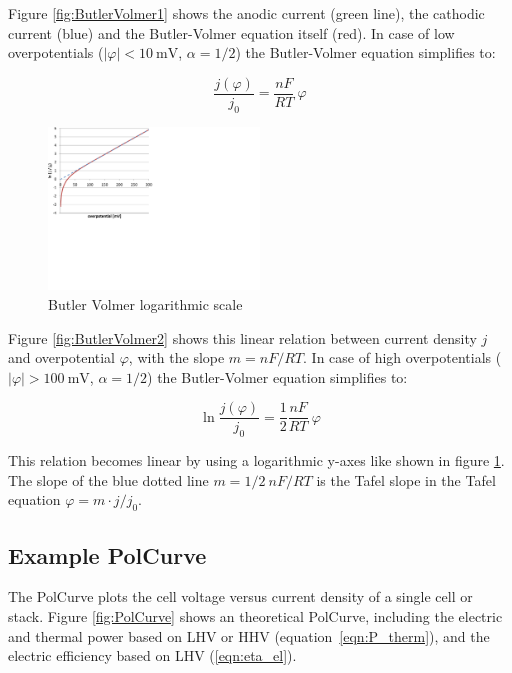 \documentclass[11pt,a4paper,english,twoside]{scrreprt}
\begin{document}
Figure \ref{fig:ButlerVolmer1} shows the anodic current (green line), the cathodic current (blue) and the Butler-Volmer equation itself (red). In case of low overpotentials ($\left|\varphi\right| < \SI{10}{\milli\volt}$, $\alpha = 1/2$) the Butler-Volmer equation simplifies to:

\[
\frac{j(\varphi)}{j_0} = \frac{n F}{RT}\: \varphi 
\]


\begin{figure}  
  \centering
  \includegraphics*[width=0.5\textwidth,angle=0]{FCF_Chart_ButlerVolmer3.pdf}
  \caption[Butler Volmer logarithmic scale]{Butler Volmer logarithmic scale}
  \label{fig:ButlerVolmerLog}
\end{figure}

Figure \ref{fig:ButlerVolmer2} shows this linear relation between current density $j$ and overpotential $\varphi$, with the slope $m=nF/RT$. In case of high overpotentials ($\left|\varphi\right| > \SI{100}{\milli\volt}$, $\alpha = 1/2$) the Butler-Volmer equation simplifies to:

\[
\ln \frac{j(\varphi)}{j_0} = \frac12 \frac{n F}{RT}\: \varphi 
\]

This relation becomes linear by using a logarithmic y-axes like shown in figure \ref{fig:ButlerVolmerLog}. The slope of the blue dotted line $m=1/2\ nF/RT$ is the Tafel slope in the Tafel equation $\varphi = m \cdot j/j_0$. 



\subsection{Example PolCurve}


The PolCurve plots the cell voltage versus current density of a single cell or stack. Figure \ref{fig:PolCurve} shows an theoretical PolCurve, including the electric and thermal power based on LHV or HHV (equation~\ref{eqn:P_therm}), and the electric efficiency based on LHV (\ref{eqn:eta_el}).
\end{document}
